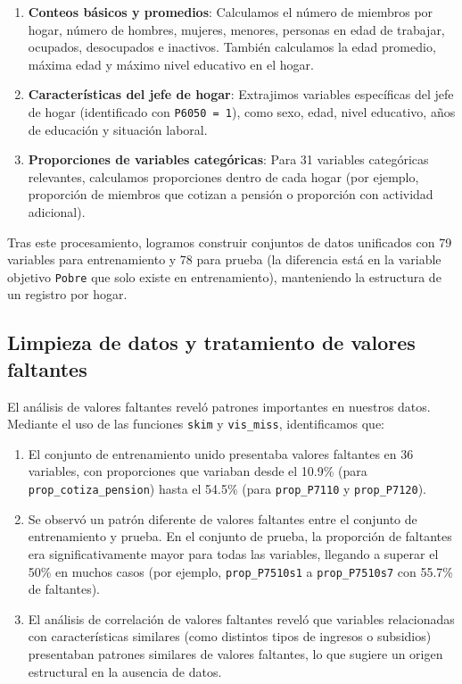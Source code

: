\documentclass[12pt,a4paper,onecolumn]{article}
\begin{document}
\begin{enumerate}
   \item \textbf{Conteos básicos y promedios}: Calculamos el número de miembros por hogar, número de hombres, mujeres, menores, personas en edad de trabajar, ocupados, desocupados e inactivos. También calculamos la edad promedio, máxima edad y máximo nivel educativo en el hogar.

   \item \textbf{Características del jefe de hogar}: Extrajimos variables específicas del jefe de hogar (identificado con \texttt{P6050 = 1}), como sexo, edad, nivel educativo, años de educación y situación laboral.

   \item \textbf{Proporciones de variables categóricas}: Para 31 variables categóricas relevantes, calculamos proporciones dentro de cada hogar (por ejemplo, proporción de miembros que cotizan a pensión o proporción con actividad adicional).
\end{enumerate}

Tras este procesamiento, logramos construir conjuntos de datos unificados con 79 variables para entrenamiento y 78 para prueba (la diferencia está en la variable objetivo \texttt{Pobre} que solo existe en entrenamiento), manteniendo la estructura de un registro por hogar.

\subsection{Limpieza de datos y tratamiento de valores faltantes}

El análisis de valores faltantes reveló patrones importantes en nuestros datos. Mediante el uso de las funciones \texttt{skim} y \texttt{vis\_miss}, identificamos que:

\begin{enumerate}
   \item El conjunto de entrenamiento unido presentaba valores faltantes en 36 variables, con proporciones que variaban desde el 10.9\% (para \texttt{prop\_cotiza\_pension}) hasta el 54.5\% (para \texttt{prop\_P7110} y \texttt{prop\_P7120}).

   \item Se observó un patrón diferente de valores faltantes entre el conjunto de entrenamiento y prueba. En el conjunto de prueba, la proporción de faltantes era significativamente mayor para todas las variables, llegando a superar el 50\% en muchos casos (por ejemplo, \texttt{prop\_P7510s1} a \texttt{prop\_P7510s7} con 55.7\% de faltantes).

   \item El análisis de correlación de valores faltantes reveló que variables relacionadas con características similares (como distintos tipos de ingresos o subsidios) presentaban patrones similares de valores faltantes, lo que sugiere un origen estructural en la ausencia de datos.
\end{enumerate}
\end{document}
